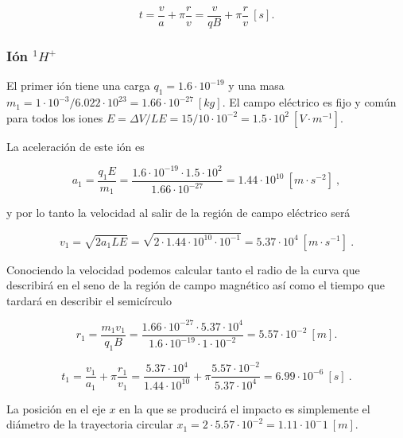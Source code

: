 \documentclass[journal]{IEEEtran}
\begin{document}
\begin{equation}
t = \displaystyle\frac{v}{a} + \pi \displaystyle\frac{r}{v} = \displaystyle\frac{v}{qB} + \pi \displaystyle\frac{r}{v}~[s].
\end{equation}

\subsubsection{Ión $^1H^+$}

El primer ión tiene una carga $q_1 = 1.6\cdot 10^{-19}$ y una masa $m_1 = 1\cdot 10^{-3} / 6.022\cdot 10^{23} = 1.66\cdot 10^{-27}~[kg]$. El campo eléctrico es fijo y común para todos los iones $E = \Delta V / LE = 15 / 10\cdot 10^{-2} = 1.5\cdot 10^2~[V\cdot m^{-1}]$.

La aceleración de este ión es

\begin{equation}
a_1 = \displaystyle\frac{q_1E}{m_1} = \displaystyle\frac{1.6\cdot 10^{-19}\cdot 1.5\cdot 10^{2}}{1.66\cdot 10^{-27}} = 1.44 \cdot 10^{10}~[m\cdot s^{-2}]~,
\end{equation}

y por lo tanto la velocidad al salir de la región de campo eléctrico será

\begin{equation}
    v_1 = \sqrt{2a_1LE} = \sqrt{2\cdot 1.44\cdot 10^{10} \cdot 10^{-1}} = 5.37 \cdot 10^4~[m\cdot s^{-1}]~.
\end{equation}

Conociendo la velocidad podemos calcular tanto el radio de la curva que describirá en el seno de la región de campo magnético así como el tiempo que tardará en describir el semicírculo

\begin{equation}
r_1 = \displaystyle\frac{m_1v_1}{q_1B} = \displaystyle\frac{1.66\cdot 10^{-27} \cdot 5.37\cdot 10^4}{1.6\cdot 10^{-19}\cdot 1 \cdot 10^{-2}} = 5.57 \cdot 10^{-2}~[m].
\end{equation}

\begin{equation}
t_1 = \displaystyle\frac{v_1}{a_1} + \pi \displaystyle\frac{r_1}{v_1} = \displaystyle\frac{5.37 \cdot 10^4}{1.44 \cdot 10^{10}} + \pi \displaystyle\frac{5.57 \cdot 10^{-2}}{5.37 \cdot 10^4} = 6.99 \cdot 10^{-6}~[s]~.
\end{equation}

La posición en el eje $x$ en la que se producirá el impacto es simplemente el diámetro de la trayectoria circular $x_1 = 2\cdot5.57 \cdot 10^{-2} = 1.11 \cdot 10^-1~[m]$.
\end{document}

